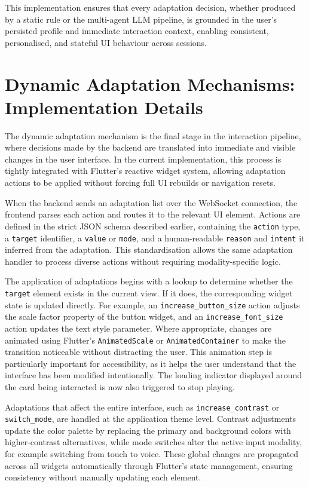 \documentclass[openany]{book}
\begin{document}
This implementation ensures that every adaptation decision, whether produced by a static rule or the multi-agent LLM pipeline, is grounded in the user’s persisted profile and immediate interaction context, enabling consistent, personalised, and stateful UI behaviour across sessions.

\section{Dynamic Adaptation Mechanisms: Implementation Details}
The dynamic adaptation mechanism is the final stage in the interaction pipeline, where decisions made by the backend are translated into immediate and visible changes in the user interface. In the current implementation, this process is tightly integrated with Flutter’s reactive widget system, allowing adaptation actions to be applied without forcing full UI rebuilds or navigation resets.

When the backend sends an adaptation list over the WebSocket connection, the frontend parses each action and routes it to the relevant UI element. Actions are defined in the strict JSON schema described earlier, containing the \texttt{action} type, a \texttt{target} identifier, a \texttt{value} or \texttt{mode}, and a human-readable \texttt{reason} and \texttt{intent} it inferred from the adaptation. This standardisation allows the same adaptation handler to process diverse actions without requiring modality-specific logic.

The application of adaptations begins with a lookup to determine whether the \texttt{target} element exists in the current view. If it does, the corresponding widget state is updated directly. For example, an \texttt{increase\_button\_size} action adjusts the scale factor property of the button widget, and an \texttt{increase\_font\_size} action updates the text style parameter. Where appropriate, changes are animated using Flutter’s \texttt{AnimatedScale} or \texttt{AnimatedContainer} to make the transition noticeable without distracting the user. This animation step is particularly important for accessibility, as it helps the user understand that the interface has been modified intentionally. The loading indicator displayed around the card being interacted is now also triggered to stop playing.

Adaptations that affect the entire interface, such as \texttt{increase\_contrast} or \texttt{switch\_mode}, are handled at the application theme level. Contrast adjustments update the color palette by replacing the primary and background colors with higher-contrast alternatives, while mode switches alter the active input modality, for example switching from touch to voice. These global changes are propagated across all widgets automatically through Flutter’s state management, ensuring consistency without manually updating each element.
\end{document}
